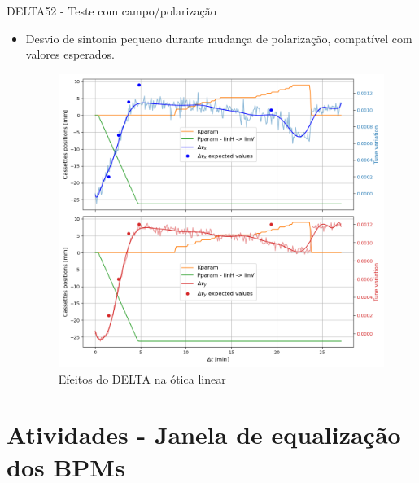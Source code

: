 \documentclass{beamer}					  %
\begin{document}
\begin{frame}{DELTA52 - Teste com campo/polarização}
    \begin{itemize}
            \item Desvio de sintonia pequeno durante mudança de polarização, compatível com valores esperados.
            \begin{figure}[H]
    		\centering
            \includegraphics[width=.7\textwidth]{2023-12-12/figures/tune_linh_linv.png}
            \caption{Efeitos do DELTA na ótica linear}
            \label{fig:linh_linv}
        \end{figure}
    \end{itemize}
\end{frame}


\section{Atividades - Janela de equalização dos BPMs}
\end{document}
